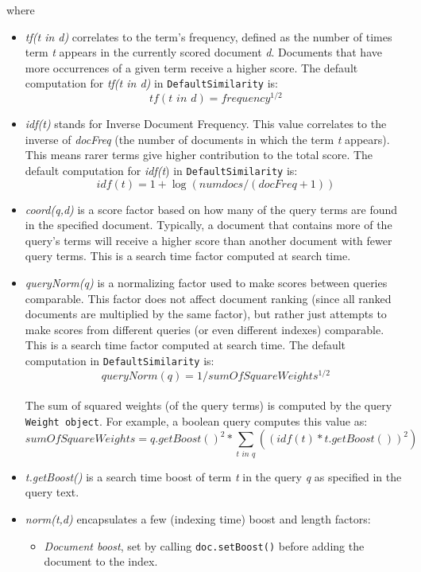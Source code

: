 where
\begin{itemize}
  \item \emph{tf(t in d)} correlates to the term's frequency, defined as the
  number of times term \emph{t} appears in the currently scored document
  \emph{d}. Documents that have more occurrences of a given term receive a
  higher score. The default computation for \emph{tf(t in d)} in
  \verb|DefaultSimilarity| is: \[ tf(t\phantom{i}in\phantom{i}d) =
  frequency^{1/2}\]
  \item \emph{idf(t)} stands for Inverse Document Frequency. This value
  correlates to the inverse of \emph{docFreq} (the number of documents in which
  the term \emph{t} appears). This means rarer terms give higher contribution to
  the total score. The default computation for \emph{idf(t}) in
  \verb|DefaultSimilarity| is: \[ idf(t)= 1 + \log (numdocs/(docFreq + 1)) \]
  \item \emph{coord(q,d)} is a score factor based on how many of the query  
  terms are found in the specified document. Typically, a document that
  contains more of the query's terms will receive a higher score than another 
  document with fewer query terms. This is a search time factor computed
  at search time.
  \item \emph{queryNorm(q)} is a normalizing factor used to make scores between
  queries comparable. This factor does not affect document ranking (since all 
  ranked documents are multiplied by the same factor), but rather just attempts
  to make scores from different queries (or even different indexes) comparable.
  This is a search time factor computed at search time. The default computation
  in \verb|DefaultSimilarity| is: \[ queryNorm(q)= 1 /sumOfSquareWeights^{1/2}\]
  \\ The sum of squared weights (of the query terms) is computed by the query
  \verb|Weight object|. For example, a boolean query  computes this value as: \[
  sumOfSquareWeights= q.getBoost()^2 *  \sum_{t\phantom{i}in\phantom{i}
q}((idf(t) * t.getBoost())^2)\]
  \item \emph{t.getBoost()} is a search time boost of term \emph{t} in the query
   \emph{q} as specified in the query text.
  \item \emph{norm(t,d)} encapsulates a few (indexing time) boost and length
  factors:
  		\begin{itemize}
            \item \emph{Document boost}, set by calling \verb|doc.setBoost()| 
            before adding the document to the index. 

\end{itemize}
\end{itemize}
